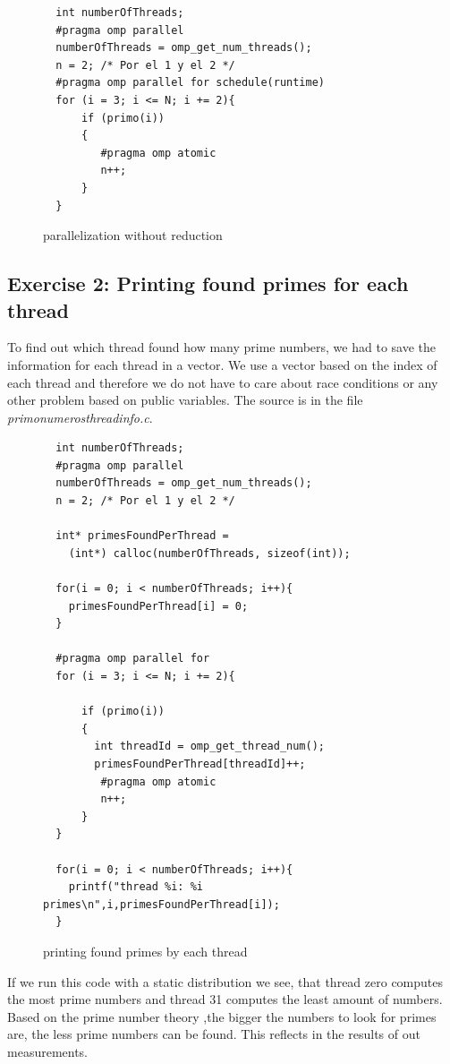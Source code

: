 \documentclass[11pt,a4paper]{article}
\begin{document}
\begin{figure}[h]
\label{code_withoutreduction}
\begin{lstlisting}
  int numberOfThreads;
  #pragma omp parallel
  numberOfThreads = omp_get_num_threads();
  n = 2; /* Por el 1 y el 2 */
  #pragma omp parallel for schedule(runtime)
  for (i = 3; i <= N; i += 2){
      if (primo(i))
      {
         #pragma omp atomic
         n++;
      }
  }
\end{lstlisting} 
\caption{parallelization without reduction}
\end{figure}

\pagebreak

\subsection{Exercise 2: Printing found primes for each thread}
\label{ex22}

To find out which thread found how many prime numbers, we had to save the information for each thread in a vector. We use a vector based on the index of each thread and therefore we do not have to care about race conditions or any other problem based on public variables. The source is in the file \textit{primo\textunderscore numeros\textunderscore threadinfo.c}.

\begin{figure}[h]
\label{code_printprimeseachthread}
\begin{lstlisting}
  int numberOfThreads;
  #pragma omp parallel
  numberOfThreads = omp_get_num_threads();
  n = 2; /* Por el 1 y el 2 */
  
  int* primesFoundPerThread = 
  	(int*) calloc(numberOfThreads, sizeof(int));
  	
  for(i = 0; i < numberOfThreads; i++){
    primesFoundPerThread[i] = 0;
  }
  
  #pragma omp parallel for
  for (i = 3; i <= N; i += 2){

      if (primo(i))
      {
        int threadId = omp_get_thread_num();
        primesFoundPerThread[threadId]++;
         #pragma omp atomic
         n++;
      }
  }
  
  for(i = 0; i < numberOfThreads; i++){
    printf("thread %i: %i primes\n",i,primesFoundPerThread[i]);
  }
\end{lstlisting} 
\caption{printing found primes by each thread}
\end{figure}

If we run this code with a static distribution we see, that thread zero computes the most prime numbers and thread 31 computes the least amount of numbers. Based on the prime number theory ,the bigger the numbers to look for primes are, the less prime numbers can be found. This reflects in the results of out measurements.
\end{document}
